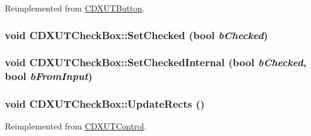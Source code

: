 Reimplemented from \hyperlink{class_c_d_x_u_t_button_a75a837a8eca0777b51d3aac6de6d6144}{CDXUTButton}.\hypertarget{class_c_d_x_u_t_check_box_ac6fa565a1c5740f2a908746b977689a2}{
\subsubsection[{SetChecked}]{\setlength{\rightskip}{0pt plus 5cm}void CDXUTCheckBox::SetChecked (bool {\em bChecked})}}
\label{class_c_d_x_u_t_check_box_ac6fa565a1c5740f2a908746b977689a2}
\hypertarget{class_c_d_x_u_t_check_box_a022d282182fef2c403b7f57ba3c81019}{
\subsubsection[{SetCheckedInternal}]{\setlength{\rightskip}{0pt plus 5cm}void CDXUTCheckBox::SetCheckedInternal (bool {\em bChecked}, \/  bool {\em bFromInput})}}
\label{class_c_d_x_u_t_check_box_a022d282182fef2c403b7f57ba3c81019}
\hypertarget{class_c_d_x_u_t_check_box_a3b60479864ee9a21c14f92ff5373fc14}{
\subsubsection[{UpdateRects}]{\setlength{\rightskip}{0pt plus 5cm}void CDXUTCheckBox::UpdateRects ()}}
\label{class_c_d_x_u_t_check_box_a3b60479864ee9a21c14f92ff5373fc14}


Reimplemented from \hyperlink{class_c_d_x_u_t_control_a5fb3a79178c678abaa0da57566a09002}{CDXUTControl}.

